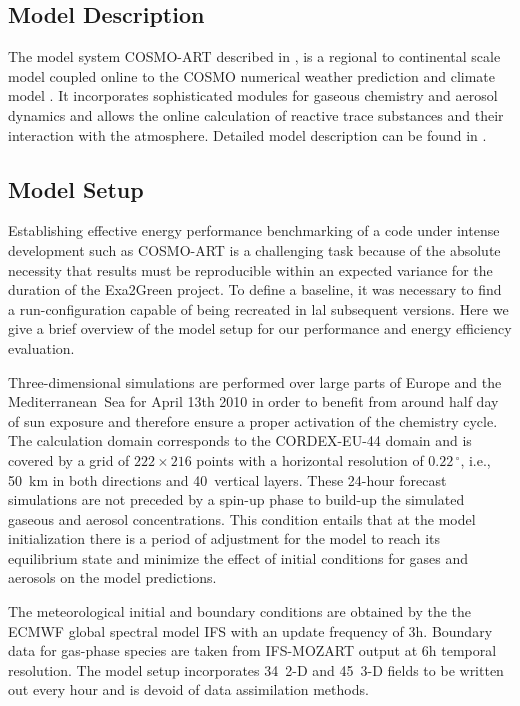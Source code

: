 \subsection{Model Description}
\label{subsec:1.1}
The  model  system COSMO-ART  described  in  \citep{Vogel-2009}, is  a
regional  to  continental scale  model  coupled  online  to the  COSMO
numerical weather  prediction and climate  model \citep{Baldauf-2011}.
It  incorporates  sophisticated  modules  for  gaseous  chemistry  and
aerosol dynamics  and allows the online calculation  of reactive trace
substances and their interaction  with the atmosphere.  Detailed model
description   can  be   found   in  \citep{Bangert-2012,   Knote-2011,
  Knote-2013}.

\subsection{Model Setup}
\label{subsec:1.2}
Establishing effective energy performance benchmarking of a code under
intense development such as COSMO-ART is a challenging task because of
the  absolute necessity that  results must  be reproducible  within an
expected variance for the duration of the Exa2Green project. To define
a baseline,  it was necessary  to find a run-configuration  capable of
being  recreated in  lal subsequent  versions.  Here  we give  a brief
overview of the model setup  for our performance and energy efficiency
evaluation.

Three-dimensional simulations are performed over large parts of Europe
and the Mediterranean~Sea for April 13th 2010 in order to benefit from
around  half  day  of  sun  exposure and  therefore  ensure  a  proper
activation of the chemistry cycle.  The calculation domain corresponds
to the CORDEX-EU-44 domain and is covered by a grid of $222\times 216$
points with  a horizontal resolution of  $0.22\,^{\circ}$, i.e., 50~km
in  both directions  and 40~vertical  layers.  These  24-hour forecast
simulations  are not  preceded  by  a spin-up  phase  to build-up  the
simulated gaseous and  aerosol concentrations.  This condition entails
that at the  model initialization there is a  period of adjustment for
the model  to reach its equilibrium  state and minimize  the effect of
initial conditions for gases and aerosols on the model predictions.

The meteorological initial and boundary conditions are obtained by the
the ECMWF  global spectral model IFS  with an update  frequency of 3h.
Boundary data  for gas-phase species are taken  from IFS-MOZART output
at  6h temporal resolution.  The model  setup incorporates  34~2-D and
45~3-D  fields to  be written  out every  hour and  is devoid  of data
assimilation methods.

